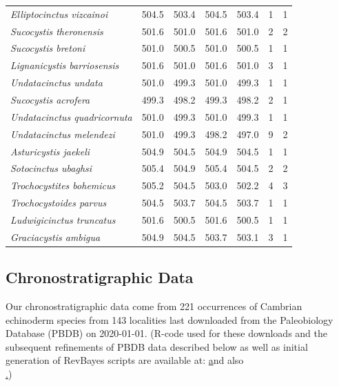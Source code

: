 \documentclass{article}
\begin{document}
\begin{table}[]
\begin{tabular}{l|llllll}
\textit{Elliptocinctus vizcainoi}    & 504.5 & 503.4 & 504.5 & 503.4 & 1  & 1  \\
\textit{Sucocystis theronensis}      & 501.6 & 501.0 & 501.6 & 501.0 & 2  & 2  \\
\rowcolor[HTML]{C0C0C0} 
\textit{Sucocystis bretoni}          & 501.0 & 500.5 & 501.0 & 500.5 & 1  & 1  \\
\textit{Lignanicystis barriosensis}  & 501.6 & 501.0 & 501.6 & 501.0 & 3  & 1  \\
\rowcolor[HTML]{C0C0C0} 
\textit{Undatacinctus undata}        & 501.0 & 499.3 & 501.0 & 499.3 & 1  & 1  \\
\textit{Sucocystis acrofera}         & 499.3 & 498.2 & 499.3 & 498.2 & 2  & 1  \\
\rowcolor[HTML]{C0C0C0} 
\textit{Undatacinctus quadricornuta} & 501.0 & 499.3 & 501.0 & 499.3 & 1  & 1  \\
\textit{Undatacinctus melendezi}     & 501.0 & 499.3 & 498.2 & 497.0 & 9  & 2  \\
\rowcolor[HTML]{C0C0C0} 
\textit{Asturicystis jaekeli}        & 504.9 & 504.5 & 504.9 & 504.5 & 1  & 1  \\
\textit{Sotocinctus ubaghsi}         & 505.4 & 504.9 & 505.4 & 504.5 & 2  & 2  \\
\rowcolor[HTML]{C0C0C0} 
\textit{Trochocystites bohemicus}    & 505.2 & 504.5 & 503.0 & 502.2 & 4  & 3  \\
\textit{Trochocystoides parvus}      & 504.5 & 503.7 & 504.5 & 503.7 & 1  & 1  \\
\rowcolor[HTML]{C0C0C0} 
\textit{Ludwigicinctus truncatus}    & 501.6 & 500.5 & 501.6 & 500.5 & 1  & 1  \\
\textit{Graciacystis ambigua}        & 504.9 & 504.5 & 503.7 & 503.1 & 3  & 1 
\end{tabular}
\end{table}


\subsection{Chronostratigraphic Data}
Our chronostratigraphic data come from 221 occurrences of Cambrian  echinoderm species from 143 localities last downloaded from the Paleobiology Database (PBDB) on 2020-01-01.  
(R-code used for these downloads and the subsequent refinements of PBDB data described below as well as initial generation of RevBayes scripts are available at: \href{http://github.com/PeterJWagner3/PaleoDB\_for\_RevBayes\_Webinar} and also \\ \href{http://paleobiodb.org/\#/resources}.)
\end{document}
